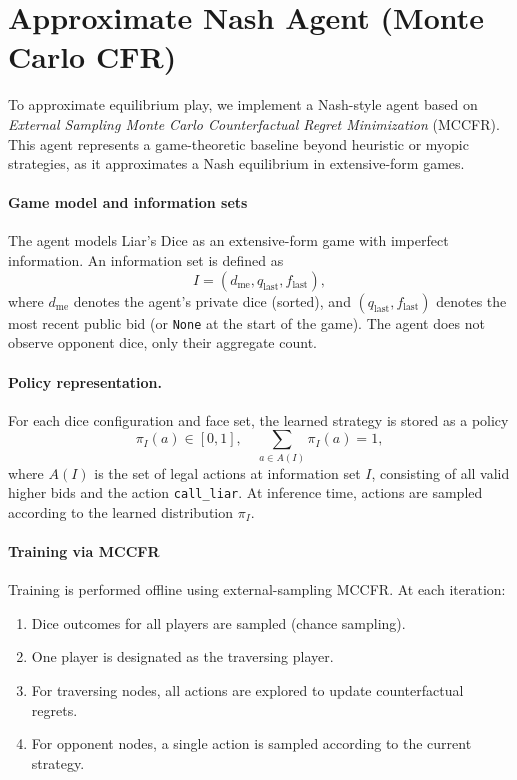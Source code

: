 \section{Approximate Nash Agent (Monte Carlo CFR)}
\label{app:mccfr_agent}

To approximate equilibrium play, we implement a Nash-style agent based on \emph{External Sampling Monte Carlo Counterfactual Regret Minimization} (MCCFR)\cite{mccfr}. This agent represents a game-theoretic baseline beyond heuristic or myopic strategies, as it approximates a Nash equilibrium in extensive-form games.

\paragraph{Game model and information sets}
The agent models Liar’s Dice as an extensive-form game with imperfect information. An information set is defined as
\[
I = (d_{\text{me}}, q_{\text{last}}, f_{\text{last}}),
\]
where \( d_{\text{me}} \) denotes the agent’s private dice (sorted), and \( (q_{\text{last}}, f_{\text{last}}) \) denotes the most recent public bid (or \texttt{None} at the start of the game). The agent does not observe opponent dice, only their aggregate count.

\paragraph{Policy representation.}
For each dice configuration and face set, the learned strategy is stored as a policy
\[
\pi_I(a) \in [0,1],
\quad \sum_{a \in A(I)} \pi_I(a) = 1,
\]
where \( A(I) \) is the set of legal actions at information set \( I \), consisting of all valid higher bids and the action \texttt{call\_liar}. At inference time, actions are sampled according to the learned distribution \( \pi_I \).

\paragraph{Training via MCCFR}
Training is performed offline using external-sampling MCCFR. At each iteration:
\begin{enumerate}
    \item Dice outcomes for all players are sampled (chance sampling).
    \item One player is designated as the traversing player.
    \item For traversing nodes, all actions are explored to update counterfactual regrets.
    \item For opponent nodes, a single action is sampled according to the current strategy.
\end{enumerate}

